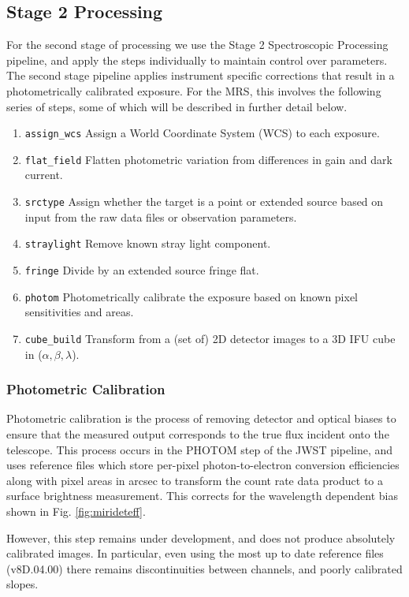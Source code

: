 \subsection{Stage 2 Processing}
For the second stage of processing we use the Stage 2 Spectroscopic Processing pipeline, and apply the steps individually to maintain control over parameters.
The second stage pipeline applies instrument specific corrections that result in a photometrically calibrated exposure. For the MRS, this involves the following series of steps, some of which will be described in further detail below.
\begin{enumerate}
	\item \verb|assign_wcs| Assign a World Coordinate System (WCS) to each exposure.
	\item \verb|flat_field| Flatten photometric variation from differences in gain and dark current.
	\item \verb|srctype| Assign whether the target is a point or extended source based on input from the raw data files or observation parameters.
	\item \verb|straylight| Remove known stray light component.
	\item \verb|fringe| Divide by an extended source fringe flat.
	\item \verb|photom| Photometrically calibrate the exposure based on known pixel sensitivities and areas.
	\item \verb|cube_build| Transform from a (set of) 2D detector images to a 3D IFU cube in ($\alpha,\beta,\lambda$).
\end{enumerate} 
\subsubsection{Photometric Calibration}
Photometric calibration is the process of removing detector and optical biases to ensure that the measured output corresponds to the true flux incident onto the telescope.
This process occurs in the PHOTOM step of the JWST pipeline, and uses reference files which store per-pixel photon-to-electron conversion efficiencies along with pixel areas in arcsec to transform the count rate data product to a surface brightness measurement.
This corrects for the wavelength dependent bias shown in Fig. \ref{fig:mirideteff}.

However, this step remains under development, and does not produce absolutely calibrated images. In particular, even using the most up to date reference files (v8D.04.00) there remains discontinuities between channels, and poorly calibrated slopes.
